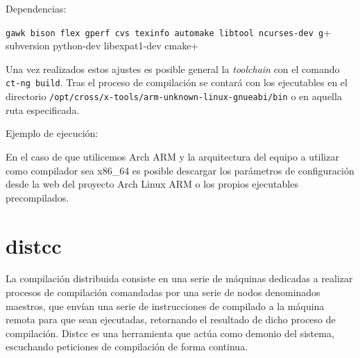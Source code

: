 \documentclass{article}
\begin{document}
Dependencias:

\verb+gawk bison flex gperf cvs texinfo automake libtool ncurses-dev g++ subversion python-dev libexpat1-dev cmake+	

Una vez realizados estos ajustes es posible general la \textit{toolchain} con el comando \texttt{ct-ng build}. Tras el proceso de compilación se contará con los ejecutables en el directorio \texttt{/opt/cross/x-tools/arm-unknown-linux-gnueabi/bin} o en aquella ruta especificada.

Ejemplo de ejecución:




En el caso de que utilicemos Arch ARM y la arquitectura del equipo a utilizar como compilador sea x86_64 es posible descargar los parámetros de configuración desde la web del proyecto Arch Linux ARM o los propios ejecutables precompilados.




\section{distcc}

La compilación distribuida consiste en una serie de máquinas dedicadas a realizar procesos de compilación comandadas por una serie de nodos denominados maestros, que envían una serie de instrucciones de compilado a la máquina remota para que sean ejecutadas, retornando el resultado de dicho proceso de compilación. Distcc es una herramienta que actúa como demonio del sistema, escuchando peticiones de compilación de forma continua.
\end{document}
